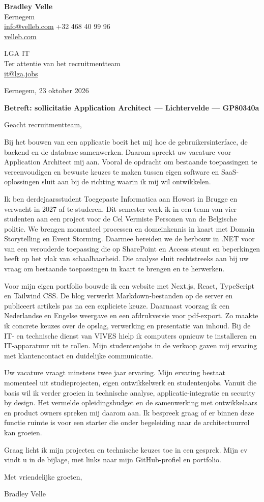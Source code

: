 \documentclass[a4paper,11pt]{article}
\begin{document}
\textbf{Bradley Velle}\\
Eernegem\\
\href{mailto:info@velleb.com}{info@velleb.com} \textperiodcentered{} +32 468 40 99 96\\
\href{https://velleb.com}{velleb.com}

LGA IT\\
Ter attentie van het recruitmentteam\\
\href{mailto:it@lga.jobs}{it@lga.jobs}

Eernegem, 23 oktober 2026

\textbf{Betreft: sollicitatie Application Architect --- Lichtervelde --- GP80340a}

Geacht recruitmentteam,

Bij het bouwen van een applicatie boeit het mij hoe de gebruikersinterface, de backend en de database samenwerken. Daarom spreekt uw vacature voor Application Architect mij aan. Vooral de opdracht om bestaande toepassingen te vereenvoudigen en bewuste keuzes te maken tussen eigen software en SaaS-oplossingen sluit aan bij de richting waarin ik mij wil ontwikkelen.

Ik ben derdejaarsstudent Toegepaste Informatica aan Howest in Brugge en verwacht in 2027 af te studeren. Dit semester werk ik in een team van vier studenten aan een project voor de Cel Vermiste Personen van de Belgische politie. We brengen momenteel processen en domeinkennis in kaart met Domain Storytelling en Event Storming. Daarmee bereiden we de herbouw in .NET voor van een verouderde toepassing die op SharePoint en Access steunt en beperkingen heeft op het vlak van schaalbaarheid. Die analyse sluit rechtstreeks aan bij uw vraag om bestaande toepassingen in kaart te brengen en te herwerken.

Voor mijn eigen portfolio bouwde ik een website met Next.js, React, TypeScript en Tailwind CSS. De blog verwerkt Markdown-bestanden op de server en publiceert artikels pas na een expliciete keuze. Daarnaast voorzag ik een Nederlandse en Engelse weergave en een afdrukversie voor pdf-export. Zo maakte ik concrete keuzes over de opslag, verwerking en presentatie van inhoud. Bij de IT- en technische dienst van VIVES hielp ik computers opnieuw te installeren en IT-apparatuur uit te rollen. Mijn studentenjobs in de verkoop gaven mij ervaring met klantencontact en duidelijke communicatie.

Uw vacature vraagt minstens twee jaar ervaring. Mijn ervaring bestaat momenteel uit studieprojecten, eigen ontwikkelwerk en studentenjobs. Vanuit die basis wil ik verder groeien in technische analyse, applicatie-integratie en security by design. Het vermelde opleidingsbudget en de samenwerking met ontwikkelaars en product owners spreken mij daarom aan. Ik bespreek graag of er binnen deze functie ruimte is voor een starter die onder begeleiding naar de architectuurrol kan groeien.

Graag licht ik mijn projecten en technische keuzes toe in een gesprek. Mijn cv vindt u in de bijlage, met links naar mijn GitHub-profiel en portfolio.

Met vriendelijke groeten,

Bradley Velle
\end{document}
